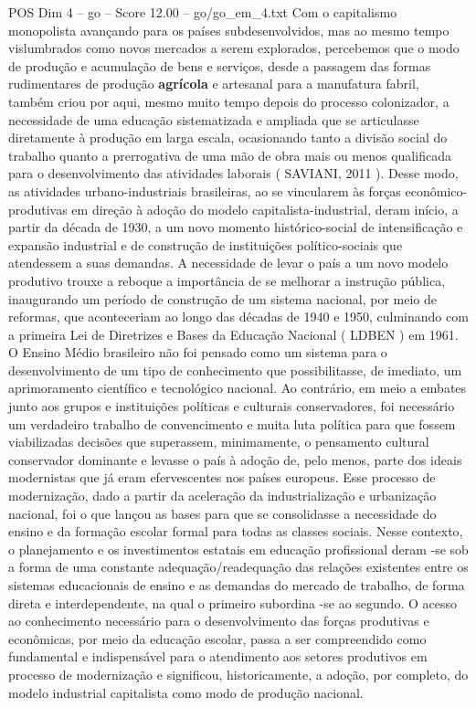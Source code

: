 \begin{textsample}{POS Dim 4 – go – Score 12.00 – go/go\_em\_4.txt}
Com o capitalismo monopolista avançando para os países subdesenvolvidos, mas ao mesmo tempo vislumbrados como novos mercados a serem explorados, percebemos que o modo de produção e acumulação de bens e serviços, desde a passagem das formas rudimentares de produção \textbf{agrícola} e artesanal para a manufatura fabril, também criou por aqui, mesmo muito tempo depois do processo colonizador, a necessidade de uma educação sistematizada e ampliada que se articulasse diretamente à produção em larga escala, ocasionando tanto a divisão social do trabalho quanto a prerrogativa de uma mão de obra mais ou menos qualificada para o desenvolvimento das atividades laborais ( SAVIANI, 2011 ).
Desse modo, as atividades urbano-industriais brasileiras, ao se vincularem às forças econômico-produtivas em direção à adoção do modelo capitalista-industrial, deram início, a partir da década de 1930, a um novo momento histórico-social de intensificação e expansão industrial e de construção de instituições político-sociais que atendessem a suas demandas.
A necessidade de levar o país a um novo modelo produtivo trouxe a reboque a importância de se melhorar a instrução pública, inaugurando um período de construção de um sistema nacional, por meio de reformas, que aconteceriam ao longo das décadas de 1940 e 1950, culminando com a primeira Lei de Diretrizes e Bases da Educação Nacional ( LDBEN ) em 1961.
O Ensino Médio brasileiro não foi pensado como um sistema para o desenvolvimento de um tipo de conhecimento que possibilitasse, de imediato, um aprimoramento científico e tecnológico nacional.
Ao contrário, em meio a embates junto aos grupos e instituições políticas e culturais conservadores, foi necessário um verdadeiro trabalho de convencimento e muita luta política para que fossem viabilizadas decisões que superassem, minimamente, o pensamento cultural conservador dominante e levasse o país à adoção de, pelo menos, parte dos ideais modernistas que já eram efervescentes nos países europeus.
Esse processo de modernização, dado a partir da aceleração da industrialização e urbanização nacional, foi o que lançou as bases para que se consolidasse a necessidade do ensino e da formação escolar formal para todas as classes sociais.
Nesse contexto, o planejamento e os investimentos estatais em educação profissional deram -se sob a forma de uma constante adequação/readequação das relações existentes entre os sistemas educacionais de ensino e as demandas do mercado de trabalho, de forma direta e interdependente, na qual o primeiro subordina -se ao segundo.
O acesso ao conhecimento necessário para o desenvolvimento das forças produtivas e econômicas, por meio da educação escolar, passa a ser compreendido como fundamental e indispensável para o atendimento aos setores produtivos em processo de modernização e significou, historicamente, a adoção, por completo, do modelo industrial capitalista como modo de produção nacional.

\end{textsample}
